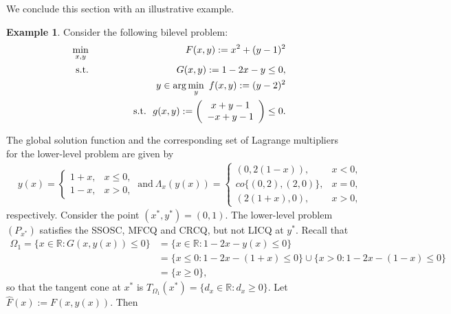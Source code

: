 \documentclass[11pt]{article}
\theoremstyle{definition}
\newtheorem{example}[theorem]{Example}
\theoremstyle{remark}
\numberwithin{equation}{section}
\begin{document}
 We conclude this section with an illustrative example.
 \begin{example}
   Consider the following bilevel problem:
   \begin{eqnarray*}
\min\limits_{x,y} && F(x,y):=x^2+(y-1)^2\\
{\rm s.t.} && G(x,y):=1-2x-y\le0,\\
&& y\in \arg\min\limits_{y}\ f(x,y):=(y-2)^2\\
&&~~~~~~~~~~~{\rm s.t.}\ \
g(x,y) :=\left(\begin{array}{c}
                x+y-1 \\
                -x+y-1
              \end{array}\right)\leq 0.
              \end{eqnarray*}
 \end{example}
 The global solution function and the corresponding set of Lagrange multipliers for the lower-level problem are given by
 \begin{align*}
    & y(x)=\left\{\begin{array}{ll}
                                        1+x, &x\le0,  \\
                                        1-x,&x>0,
                                       \end{array}\right.
                                       ~\text{and}~
                                        \Lambda_{x}(y(x))=
                                       \left\{\begin{array}{ll}
                                        (0,2(1-x)), &x<0,  \\
                                        co\{(0,2),(2,0)\}, &x=0,\\
                                        (2(1+x),0),&x>0,
                                       \end{array}\right.
 \end{align*}
 respectively.
 Consider the point $(x^*,y^*)=(0,1)$. The lower-level problem $(P_{x^*})$ satisfies the SSOSC, MFCQ and CRCQ, but not LICQ at $y^*$. Recall that
 \begin{align*}
     \Omega_1=\{x\in\mathbb{R}:G(x,y(x))\le0\}&=\{x\in\mathbb{R}:1-2x-y(x)\le0\}\\
     &=\{x\le0:1-2x-(1+x)\le0\}\cup\{x>0:1-2x-(1-x)\le0\} \\
     &=\{x\ge 0\},
 \end{align*}
    so that  the tangent cone at $x^*$ is  $T_{\Omega_1}(x^*)=\{d_x\in\mathbb{R}:d_x\ge0\}$.
 Let $\widehat{F}(x):=F(x,y(x))$. Then
\end{document}
